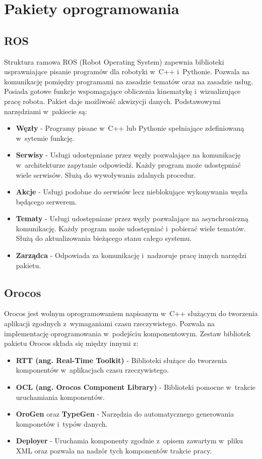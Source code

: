 	\section{Pakiety oprogramowania}
	\subsection{ROS}
	Struktura ramowa ROS (Robot Operating System)\cite{bib:ROS} zapewnia biblioteki usprawniające pisanie programów dla robotyki w~C++ i~Pythonie. Pozwala na komunikację pomiędzy programami na zasadzie tematów oraz na zasadzie usług. Posiada gotowe funkcje wspomagające obliczenia kinematykę i~wizualizujące pracę robota. Pakiet daje możliwość akwizycji danych. Podstawowymi narzędziami w~pakiecie są:
	\begin{itemize}
		\item \textbf{Węzły} - Programy pisane w~C++ lub Pythonie spełniające zdefiniowaną w~sytemie funkcję.
		\item \textbf{Serwisy} - Usługi udostępniane przez węzły pozwalające na komunikację w~architekturze zapytanie odpowiedź. Każdy program może udostępniać wiele serwisów. Służą do wywoływania zdalnych procedur.
		\item \textbf{Akcje} - Usługi podobne do serwisów lecz nieblokujące wykonywania węzła będącego serwerem.
		\item \textbf{Tematy} - Usługi udostępniane przez węzły pozwalające na asynchroniczną komunikację. Każdy program może udostępniać i~pobierać wiele tematów. Służą do aktualizowania bieżącego stanu całego systemu.
		\item \textbf{Zarządca} - Odpowiada za komunikację i~nadzoruje pracę innych narzędzi pakietu.
	\end{itemize}
	\subsection{Orocos}
	Orocos \cite{bib:Orocos} jest wolnym oprogramowaniem napisanym w~C++ służącym do tworzenia aplikacji zgodnych z~wymaganiami czasu rzeczywistego. Pozwala na implementację  oprogramowania w~podejściu komponentowym. Zestaw bibliotek pakietu Orocos składa się między innymi z:
	\begin{itemize}
		\item \textbf{RTT (ang. Real-Time Toolkit)} - Biblioteki służące do  tworzenia komponentów w~aplikacjach czasu rzeczywistego.
		\item \textbf{OCL (ang. Orocos Component Library)} - Biblioteki pomocne w~trakcie uruchamiania komponentów.
		\item \textbf{OroGen} oraz \textbf{TypeGen} - Narzędzia do automatycznego generowania komponetów i~typów danych.
		\item \textbf{Deployer} - Uruchamia komponenty zgodnie z~opisem zawartym w~pliku XML oraz pozwala na nadzór tych komponentów trakcie pracy.
	\end{itemize}

